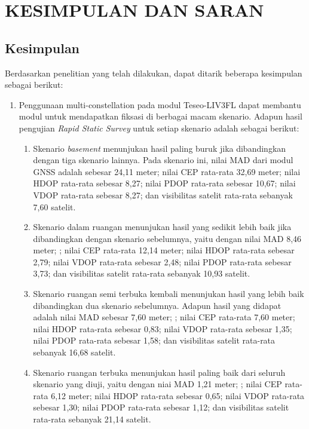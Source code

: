 \chapter{KESIMPULAN DAN SARAN}

\section{Kesimpulan}
Berdasarkan penelitian yang telah dilakukan, dapat ditarik beberapa kesimpulan sebagai berikut:
\begin{enumerate}
	\item Penggunaan multi-constellation pada modul Teseo-LIV3FL dapat membantu modul untuk mendapatkan fiksasi di berbagai macam skenario. Adapun hasil pengujian \textit{Rapid Static Survey} untuk setiap skenario adalah sebagai berikut:
	\begin{enumerate}
		\item Skenario \textit{basement} menunjukan hasil paling buruk jika dibandingkan dengan tiga skenario lainnya. Pada skenario ini, nilai MAD dari modul GNSS adalah sebesar 24,11 meter; nilai CEP rata-rata 32,69 meter; nilai HDOP rata-rata sebesar 8,27; nilai PDOP rata-rata sebesar 10,67; nilai VDOP rata-rata sebesar 8,27; dan visibilitas satelit rata-rata sebanyak 7,60 satelit.
		
		\item Skenario dalam ruangan menunjukan hasil yang sedikit lebih baik jika dibandingkan dengan skenario sebelumnya, yaitu dengan nilai MAD 8,46 meter; ; nilai CEP rata-rata 12,14 meter; nilai HDOP rata-rata sebesar 2,79; nilai VDOP rata-rata sebesar 2,48; nilai PDOP rata-rata sebesar 3,73; dan visibilitas satelit rata-rata sebanyak 10,93 satelit.
		
		\item Skenario ruangan semi terbuka kembali menunjukan hasil yang lebih baik dibandingkan dua skenario sebelumnya. Adapun hasil yang didapat adalah nilai MAD sebesar 7,60 meter; ; nilai CEP rata-rata 7,60 meter; nilai HDOP rata-rata sebesar 0,83; nilai VDOP rata-rata sebesar 1,35; nilai PDOP rata-rata sebesar 1,58; dan visibilitas satelit rata-rata sebanyak 16,68 satelit.
		
		\item Skenario ruangan terbuka menunjukan hasil paling baik dari seluruh skenario yang diuji, yaitu dengan niai MAD 1,21 meter; ; nilai CEP rata-rata 6,12 meter; nilai HDOP rata-rata sebesar 0,65; nilai VDOP rata-rata sebesar 1,30; nilai PDOP rata-rata sebesar 1,12; dan visibilitas satelit rata-rata sebanyak 21,14 satelit.
	\end{enumerate}
	

\end{enumerate}
